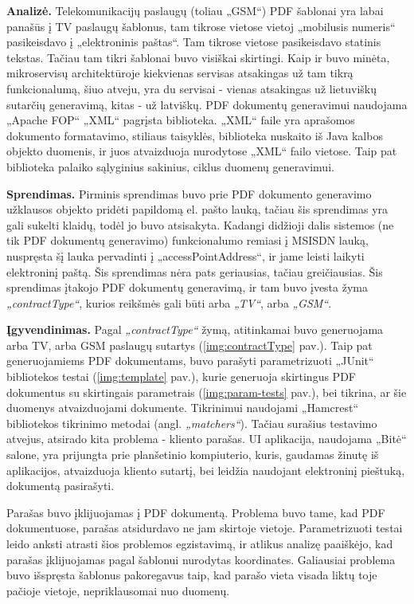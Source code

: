 \textbf{Analizė.} Telekomunikacijų paslaugų (toliau „GSM“) PDF šablonai yra labai panašūs į TV paslaugų šablonus, tam tikrose vietose vietoj „mobilusis numeris“ pasikeisdavo į
„elektroninis paštas“. Tam tikrose vietose pasikeisdavo statinis tekstas. Tačiau tam tikri šablonai buvo visiškai skirtingi.
Kaip ir buvo minėta, mikroservisų architektūroje kiekvienas servisas atsakingas už tam tikrą funkcionalumą, šiuo atveju, yra du servisai -
vienas atsakingas už lietuviškų sutarčių generavimą, kitas - už latviškų. PDF dokumentų generavimui naudojama „Apache FOP“ „XML“ pagrįsta biblioteka.
„XML“ faile yra aprašomos dokumento formatavimo, stiliaus taisyklės, biblioteka nuskaito iš Java kalbos objekto duomenis, ir juos atvaizduoja nurodytose „XML“ failo vietose.
Taip pat biblioteka palaiko sąlyginius sakinius, ciklus duomenų generavimui.

\textbf{Sprendimas.} Pirminis sprendimas buvo prie PDF dokumento generavimo užklausos objekto pridėti papildomą el. pašto lauką, tačiau šis sprendimas yra gali sukelti klaidų, todėl
jo buvo atsisakyta. Kadangi didžioji dalis sistemos (ne tik PDF dokumentų generavimo) funkcionalumo remiasi į MSISDN lauką, nuspręsta šį lauka pervadinti
į \textit{}„accessPointAddress“, ir jame leisti laikyti elektroninį paštą.
Šis sprendimas nėra pats geriausias, tačiau greičiausias. Šis sprendimas įtakojo PDF dokumentų generavimą, ir tam buvo įvesta žyma
\textit{„contractType“}, kurios reikšmės gali būti arba \textit{„TV“}, arba \textit{„GSM“}.

\textbf{Įgyvendinimas.} Pagal \textit{„contractType“} žymą, atitinkamai buvo generuojama arba TV, arba GSM paslaugų sutartys (\ref{img:contractType} pav.).
Taip pat generuojamiems PDF dokumentams, buvo parašyti parametrizuoti „JUnit“ bibliotekos testai (\ref{img:template} pav.), kurie generuoja skirtingus PDF dokumentus su
skirtingais parametrais (\ref{img:param-tests} pav.), bei tikrina, ar šie duomenys atvaizduojami dokumente.
Tikrinimui naudojami „Hamcrest“ bibliotekos tikrinimo metodai (angl. \textit{„matchers“}).
Tačiau surašius testavimo atvejus, atsirado kita problema - kliento parašas. UI aplikacija, naudojama „Bitė“ salone,
yra prijungta prie planšetinio kompiuterio, kuris, gaudamas žinutę iš aplikacijos, atvaizduoja kliento sutartį, bei leidžia naudojant elektroninį pieštuką, dokumentą pasirašyti.

Parašas buvo įklijuojamas į PDF dokumentą. Problema buvo tame, kad PDF dokumentuose, parašas atsidurdavo ne jam skirtoje vietoje.
Parametrizuoti testai leido anksti atrasti šios problemos egzistavimą, ir atlikus analizę paaiškėjo, kad parašas įklijuojamas pagal šablonui nurodytas koordinates.
Galiausiai problema buvo išspręsta šablonus pakoregavus taip, kad parašo vieta visada liktų toje pačioje vietoje, nepriklausomai nuo duomenų.

